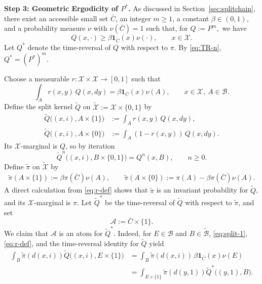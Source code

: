\documentclass[mnsc,nonblindrev]{informs3}
\begin{document}
\medskip
\noindent\textbf{Step 3: Geometric Ergodicity of $P^\ast$.} 
As discussed in Section~\ref{sec:splitchain}, there exist an accessible small set
\(\bar C\), an integer \(m\ge1\), a constant \(\beta\in(0,1)\), and a probability
measure \(\nu\) with \(\nu(\bar C)=1\) such that, for $Q:=P^m,$ we have
\begin{equation*}
Q(x,\cdot)\ge \beta \mathbf 1_{\bar C}(x)\nu(\cdot),
\qquad x\in\mathcal X.
\end{equation*}
Let \(Q^\ast\) denote the time-reversal of \(Q\) with respect to \(\pi\). By
\eqref{eq:TR-n}, $Q^\ast=(P^\ast)^m.$


Choose a measurable \(r:\mathcal X\times\mathcal X\to[0,1]\) such that
\begin{equation}\label{eq:r-def}
\int_A r(x,y)\,Q(x,dy)
=\beta \mathbf 1_{\bar C}(x)\nu(A),
\qquad x\in\mathcal X,\ A\in\mathcal B.
\end{equation}
Define the split kernel \(\widetilde Q\) on
\(\widetilde{\mathcal X}:=\mathcal X\times\{0,1\}\) by
\begin{align}
\widetilde Q\big((x,i),A\times\{1\}\big)
&:= \int_A r(x,y)\,Q(x,dy), \label{eq:split-1}\\
\widetilde Q\big((x,i),A\times\{0\}\big)
&:= \int_A (1-r(x,y))\,Q(x,dy). \nonumber
\end{align}
Its \(\mathcal X\)-marginal is \(Q\), so by iteration
\begin{equation}\label{eq:proj-forward}
\widetilde Q^n\big((x,i),B\times\{0,1\}\big)=Q^n(x,B),
\qquad n\ge0.
\end{equation}
Define \(\widetilde\pi\) on \(\widetilde{\mathcal X}\) by
\begin{align*}
\widetilde\pi(A\times\{1\}) := \beta\pi(\bar C)\nu(A), \qquad \widetilde\pi(A\times\{0\}) := \pi(A)-\beta\pi(\bar C)\nu(A).
\end{align*}
A direct calculation from \eqref{eq:r-def} shows that \(\widetilde\pi\) is an
invariant probability for \(\widetilde Q\), and its \(\mathcal X\)-marginal is \(\pi\). Let \(\widetilde Q^\ast\) be the time-reversal of \(\widetilde Q\) with respect to
\(\widetilde\pi\), and set
\[
\mathcal A:=\bar C\times\{1\}.
\]
We claim that \(\mathcal A\) is an atom for \(\widetilde Q^\ast\). Indeed, for
\(E\in\mathcal B\) and \(B\in\widetilde{\mathcal B}\), \eqref{eq:split-1},
\eqref{eq:r-def}, and the time-reversal identity for \(\widetilde Q\) yield
\begin{align*}
\int_B \widetilde\pi(d(x,i))\widetilde Q\big((x,i),E\times\{1\}\big)
&= \int_B \widetilde\pi(d(x,i))\,\beta\mathbf 1_{\bar C}(x)\nu(E) \\
&= \int_{E\times\{1\}} \widetilde\pi(d(y,1))
   \widetilde Q^\ast\big((y,1),B\big).
\end{align*}
\end{document}
